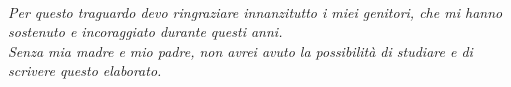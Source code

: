 ~\\
~\\
~\\
~\\
~\\
~\\
~\\
~\\
~\\
~\\
~\\
~\\
~\\
~\\
~\\
~\\
~\\
~\\
~\\
~\\
~\\
~\\
~\\
~\\
~\\
~\\
~\\
~\\
~\\
~\\
~\\
~\\
~\\
\begin{center}
\emph{Per questo traguardo devo ringraziare innanzitutto i miei genitori, che mi hanno sostenuto e incoraggiato durante questi anni.\\Senza mia madre e mio padre, non avrei avuto la possibilità di studiare e di scrivere questo elaborato.}
\end{center}